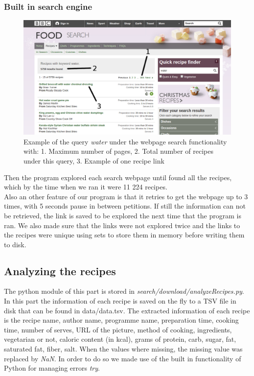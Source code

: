 \documentclass[paper=a4, fontsize=11pt]{scrartcl} %
\numberwithin{equation}{section} %
\numberwithin{figure}{section} %
\numberwithin{table}{section} %
\begin{document}
\subsubsection{Built in search engine}

\begin{figure}[H]
\centering
\includegraphics[width=1\textwidth]{images/search}
\caption{Example of the query \textit{water} under the webpage search functionality with: 1. Maximum number of pages, 2. Total number of recipes under this query, 3. Example of one recipe link}
\end{figure}

Then the program explored each search webpage until found all the recipes, which by the time when we ran it were 11 224 recipes. \\
Also an other feature of our program is that it retries to get the webpage up to 3 times, with 5 seconds pause in between petitions. If still the information can not be retrieved, the link is saved to be explored the next time that the program is ran. We also made sure that the links were not explored twice and the links to the recipes were unique using sets to store them in memory before writing them to disk. 

\subsection{Analyzing the recipes}
 The python module of this part is stored in \textit{search/download/analyzeRecipes.py}. In this part the information of each recipe is saved on the fly to a TSV file in disk that can be found in data/data.tsv. The extracted information of each recipe is the recipe name, author name, programme name, preparation time, cooking time, number of serves, URL of the picture, method of cooking, ingredients, vegetarian or not, caloric content (in kcal), grams of protein, carb, sugar, fat, saturated fat, fiber, salt. When the values where missing, the missing value was replaced by \textit{NaN}. In order to do so we made use of the built in functionality of Python for managing errors \textit{try}.
 
\end{document}
